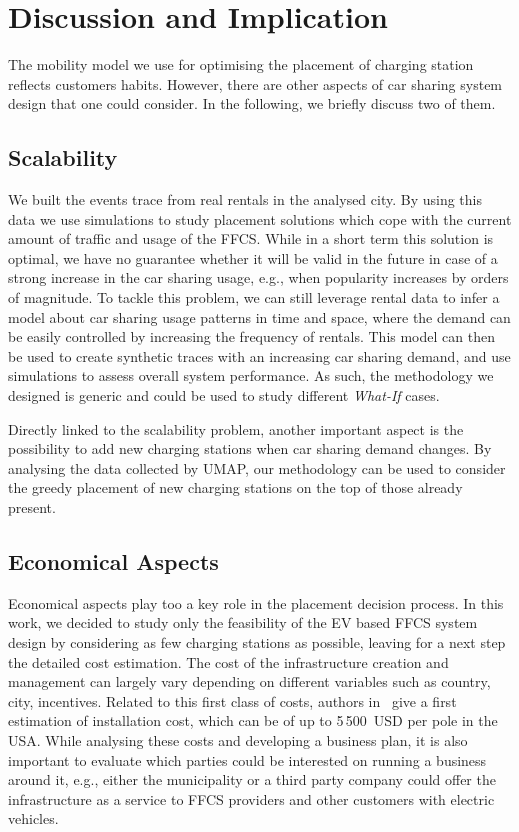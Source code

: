 \section{Discussion and Implication}
\label{sec:discussion}

The mobility model we use for optimising the placement of charging station reflects customers habits. However, there are other aspects of car sharing system design that one could consider. In the following, we briefly discuss two of them.

\subsection{\textbf{Scalability}}

We built the events trace from real rentals in the analysed city. By using this data we use simulations to study placement solutions which cope with the current amount of traffic and usage of the FFCS. While in a short term this solution is optimal, we have no guarantee whether it will be valid in the future in case of a strong increase in the car sharing usage, e.g., when popularity increases by orders of magnitude. To tackle this problem, we can still leverage rental data to infer a model about car sharing usage patterns in time and space, where the demand can be easily controlled by increasing the frequency of rentals. This model can then be used to create synthetic traces with an increasing car sharing demand, and use simulations to assess overall system performance. As such, the methodology we designed is generic and could be used to study different \textit{What-If} cases.

Directly linked to the scalability problem, another important aspect is the possibility to add new charging stations when car sharing demand changes. 
By analysing the data collected by UMAP, our methodology can be used to consider the greedy placement of new charging stations on the top of those already present.

\subsection{\textbf{Economical Aspects}}


Economical aspects play too a key role in the placement decision process. In this work, we decided to study only the feasibility of the EV based FFCS system design by considering as few charging stations as possible, leaving for a next step the detailed cost estimation. The cost of the infrastructure creation and management can largely vary depending on different variables such as country, city, incentives. 
Related to this first class of costs, authors in~\cite{USAInstallCost} give a first estimation of installation cost, which can be of up to 5\,500~USD per pole in the USA. 
While analysing these costs and developing a business plan, it is also important to evaluate which parties could be interested on running a business around it, e.g., either the municipality or a third party company could offer the infrastructure as a service to FFCS providers and other customers with electric vehicles.  

